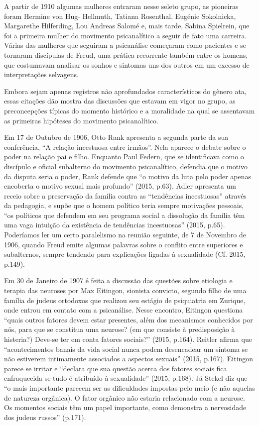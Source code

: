 A partir de 1910 algumas mulheres entraram nesse seleto grupo, as
pioneiras foram Hermine von Hug- Hellmuth, Tatiana Rosenthal, Eugénie
Sokolnicka, Margarethe Hilferding, Lou Andreas Salomé e, mais tarde,
Sabina Spielrein, que foi a primeira mulher do movimento psicanalítico a
seguir de fato uma carreira. Várias das mulheres que seguiram a
psicanálise começaram como pacientes e se tornaram discípulas de Freud,
uma prática recorrente também entre os homens, que costumavam analisar
os sonhos e sintomas uns dos outros em um excesso de interpretações
selvagens.

Embora sejam apenas registros não aprofundados característicos do gênero
ata, essas citações dão mostra das discussões que estavam em vigor no
grupo, as preconcepções típicas do momento histórico e a moralidade na
qual se assentavam as primeiras hipóteses do movimento psicanalítico.

Em 17 de Outubro de 1906, Otto Rank apresenta a segunda parte da sua
conferência, ``A relação incestuosa entre irmãos''. Nela aparece o
debate sobre o poder na relação pai e filho. Enquanto Paul Federn, que
se identificava como o discípulo e oficial subalterno do movimento
psicanalítico, defendia que o motivo da disputa seria o poder, Rank
defende que ``o motivo da luta pelo poder apenas encoberta o motivo
sexual mais profundo'' (2015, p.63). Adler apresenta um receio sobre a
preservação da família contra as ``tendências incestuosas'' através da
pedagogia, e supõe que o homem político teria sempre motivações
pessoais, ``os políticos que defendem em seu programa social a dissolução
da família têm uma vaga intuição da existência de tendências
incestuosas'' (2015, p.65). Poderíamos ler um certo paralelismo na
reunião seguinte, de 7 de Novembro de 1906, quando Freud emite algumas
palavras sobre o conflito entre superiores e subalternos, sempre
tendendo para explicações ligadas à sexualidade (Cf. 2015, p.149).

Em 30 de Janeiro de 1907 é feita a discussão das questões sobre
etiologia e terapia das neuroses por Max Eitingon, sionista convicto,
segundo filho de uma família de judeus ortodoxos que realizou seu
estágio de psiquiatria em Zurique, onde entrou em contato com a
psicanálise. Nesse encontro, Eitingon questiona ``quais outros fatores
devem estar presentes, além dos mecanismos conhecidos por nós, para que
se constitua uma neurose? (em que consiste à predisposição à histeria?)
Deve-se ter em conta fatores sociais?'' (2015, p.164). Reitler afirma
que ``acontecimentos banais da vida social nunca podem desencadear um
sintoma se não estiverem intimamente associados a aspectos sexuais''
(2015, p.167). Eitingon parece se irritar e ``declara que sua questão
acerca dos fatores sociais fica enfraquecida se tudo é atribuído à
sexualidade'' (2015, p.168). Já Stekel diz que ``o mais importante
parecem ser as dificuldades impostas pelo meio (e não aquelas de
natureza orgânica). O fator orgânico não estaria relacionado com a
neurose. Os momentos sociais têm um papel importante, como demonstra a
nervosidade dos judeus russos'' (p.171).


